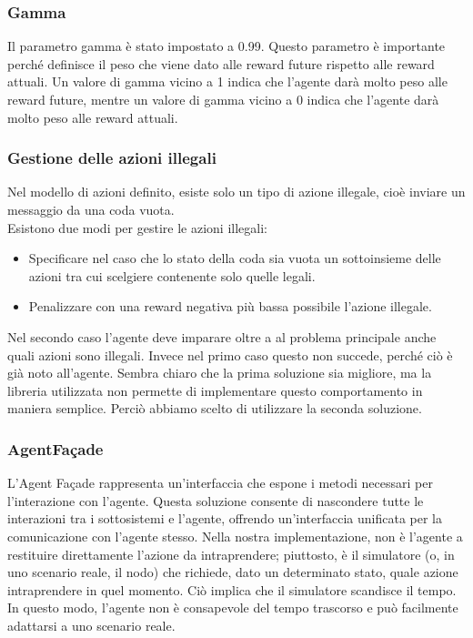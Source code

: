 \documentclass[conference]{IEEEtran}
\begin{document}
\subsubsection{Gamma}
Il parametro gamma è stato impostato a 0.99. Questo parametro è importante perché definisce il peso che viene dato alle reward future rispetto alle reward attuali. Un valore di gamma vicino a 1 indica che l'agente darà molto peso alle reward future, mentre un valore di gamma vicino a 0 indica che l'agente darà molto peso alle reward attuali.

\subsubsection{Gestione delle azioni illegali}
Nel modello di azioni definito, esiste solo un tipo di azione illegale, cioè inviare un messaggio da una coda vuota. \\
Esistono due modi per gestire le azioni illegali:
\begin{itemize}
    \item Specificare nel caso che lo stato della coda sia vuota un sottoinsieme delle azioni tra cui scelgiere contenente solo quelle legali.
    \item Penalizzare con una reward negativa più bassa possibile l'azione illegale.
\end{itemize}
Nel secondo caso l'agente deve imparare oltre a al problema principale anche quali azioni sono illegali. Invece nel primo caso questo non succede, perché ciò è già noto all'agente.
Sembra chiaro che la prima soluzione sia migliore, ma la libreria utilizzata non permette di implementare questo comportamento in maniera semplice. Perciò abbiamo scelto di utilizzare la seconda soluzione.


\subsubsection{AgentFaçade}
L'Agent Façade rappresenta un'interfaccia che espone i metodi necessari per l'interazione con l'agente. Questa soluzione consente di nascondere tutte le interazioni tra i sottosistemi e l'agente, offrendo un'interfaccia unificata per la comunicazione con l'agente stesso. Nella nostra implementazione, non è l'agente a restituire direttamente l'azione da intraprendere; piuttosto, è il simulatore (o, in uno scenario reale, il nodo) che richiede, dato un determinato stato, quale azione intraprendere in quel momento. Ciò implica che il simulatore scandisce il tempo. In questo modo, l'agente non è consapevole del tempo trascorso e può facilmente adattarsi a uno scenario reale.
\end{document}
